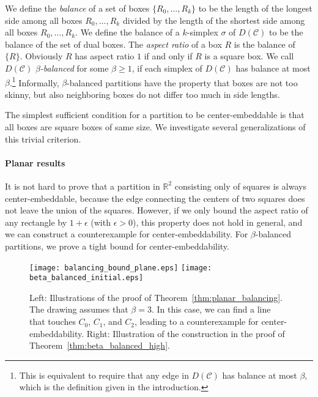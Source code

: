 \documentclass[12pt]{article}
\newcommand{\R}{\mathbb{R}}
\newcommand{\eps}{\epsilon}
\newcommand{\partition}{\mathcal{C}}
\begin{document}
We define the \emph{balance} of
a set of boxes $\{R_0,\ldots,R_k\}$
to be the length of the longest side among all boxes $R_0,\ldots,R_k$ divided by the length of the shortest side
among all boxes $R_0,\ldots,R_k$.
We define the balance of a $k$-simplex $\sigma$ of $D(\partition)$ to be the balance of the set of dual boxes.
The \emph{aspect ratio} of a box $R$ is the balance of $\{R\}$.
Obviously $R$ has aspect ratio $1$ if and only if $R$ is a square box.
We call $D(\partition)$ \emph{$\beta$-balanced} for some $\beta\geq 1$, if each simplex
of $D(\partition)$ has balance at most $\beta$.\footnote{This is equivalent to require
that any edge in $D(\partition)$ has balance at most $\beta$, which is the definition
given in the introduction.}
Informally, 
$\beta$-balanced partitions have the property that 
boxes are not too skinny, but also
neighboring boxes do not differ
too much in side lengths. 

The simplest sufficient condition for a partition to be center-embeddable is that all boxes
are square boxes of same size. We investigate several generalizations of this trivial criterion.

\paragraph{Planar results}
It is not hard to prove that a partition in $\R^2$ consisting 
only of squares is always center-embeddable, 
because the edge connecting the centers of two squares does not leave the union of the squares.
However, if we only bound the aspect ratio of any rectangle by $1+\eps$ (with $\eps>0$),
this property does not hold in general, and we can construct a counterexample
for center-embeddability.
For $\beta$-balanced partitions, we prove a tight bound for center-embeddability. 

\begin{figure}
\centering
\texttt{[image: balancing\_bound\_plane.eps]}
\hspace{1cm}
\texttt{[image: beta\_balanced\_initial.eps]}
\caption{Left: Illustrations of the proof of Theorem~\ref{thm:planar_balancing}.
The drawing assumes that $\beta=3$. In this case, we can find a line that touches
$C_0$, $C_1$, and $C_2$, leading to a counterexample for center-embeddability.
Right: Illustration of the construction in the proof of Theorem~\ref{thm:beta_balanced_high}.}
\label{fig:worst_case_3d}
\label{fig:beta_balanced_plane}
\end{figure}
\end{document}
